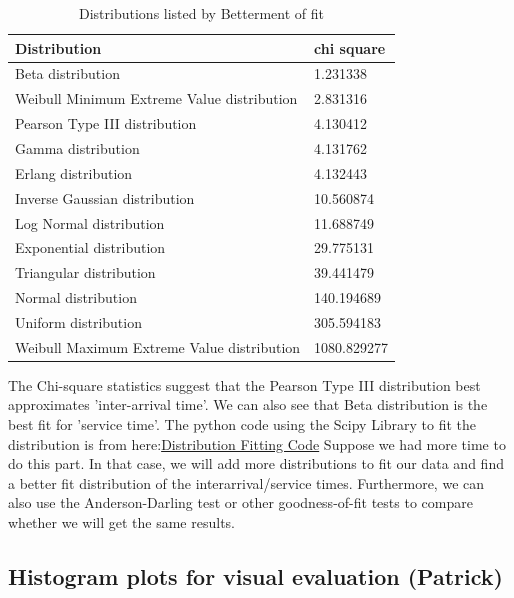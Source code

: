 \documentclass{article}
\begin{document}
\begin{table}[h!]
    \centering
    \caption{Distributions listed by Betterment of fit}
    \begin{tabu}{*{2}{X[c]}}
        \toprule
        \textbf{Distribution} & \textbf{chi square}\\
        \midrule
        Beta distribution & 1.231338\\
        Weibull Minimum Extreme Value distribution & 2.831316\\
        Pearson Type III distribution & 4.130412\\
        Gamma distribution & 4.131762\\
        Erlang distribution & 4.132443\\
        Inverse Gaussian distribution & 10.560874\\
        Log Normal distribution & 11.688749\\
        Exponential distribution & 29.775131\\
        Triangular distribution & 39.441479\\
        Normal distribution & 140.194689\\
        Uniform distribution & 305.594183\\
        Weibull Maximum Extreme Value distribution & 1080.829277\\
        \bottomrule
    \end{tabu}
    \label{tab:Service Best Fit}
\end{table}

The Chi-square statistics suggest that the Pearson Type III distribution best approximates 'inter-arrival time'. We can also see that Beta distribution is the best fit for 'service time'. The python code using the Scipy Library to fit the distribution is from here:\href{https://github.com/mungoliabhishek/Distribution-Fitting-Used_Car_Dataset/blob/master/Workbook.ipynb}{Distribution Fitting Code} Suppose we had more time to do this part. In that case, we will add more distributions to fit our data and find a better fit distribution of the interarrival/service times. Furthermore, we can also use the Anderson-Darling test or other goodness-of-fit tests to compare whether we will get the same results.

\subsection{Histogram plots for visual evaluation (Patrick)}
\end{document}
